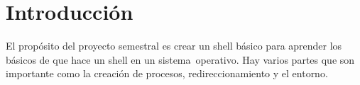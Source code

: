 \section{Introducción}
El propósito del proyecto semestral es crear un shell básico para aprender los básicos de que hace un shell en un sistema\
operativo. Hay varios partes que son importante como la creación de procesos, redireccionamiento y el entorno.